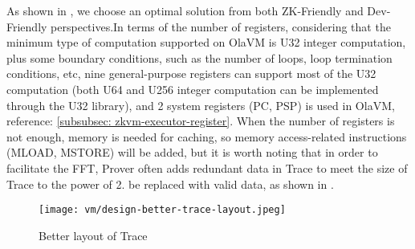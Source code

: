 As shown in , we choose an optimal solution from both ZK-Friendly and Dev-Friendly perspectives.In terms of the number of
registers, considering that the minimum type of computation supported on OlaVM is U32 integer computation, plus some boundary conditions,
such as the number of loops, loop termination conditions, etc, nine general-purpose registers can support most of the U32 computation
(both U64 and U256 integer computation can be implemented through the U32 library), and 2 system registers (PC, PSP) is used in OlaVM, reference: \ref{subsubsec: zkvm-executor-register}. 
When the number of registers is not enough, memory is needed for caching, so memory access-related instructions
(MLOAD, MSTORE) will be added, but it is worth noting that in order to facilitate the FFT, Prover often adds redundant data in Trace to meet
the size of Trace to the power of 2. be replaced with valid data, as shown in .

\begin{figure}[!ht]
    \centering
    \texttt{[image: vm/design-better-trace-layout.jpeg]}
    \caption{Better layout of Trace}
    \label{fig:design-better-trace-layout}
\end{figure}
